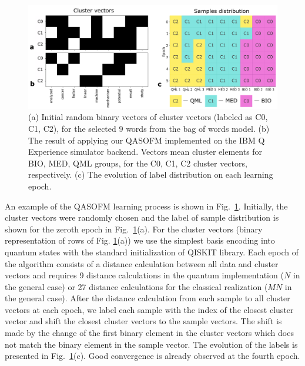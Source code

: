 \documentclass[pra,showkeys,twocolumn,showpacs,aps,10pt]{revtex4-2}
\begin{document}
\begin{figure}[t]
  \includegraphics[width=1.85\columnwidth]{convergence.png}
  \caption{
    (a) Initial random binary vectors of cluster vectors (labeled as C0, C1, C2),
    for the selected 9 words from the bag of words model.
    (b) The result of applying our QASOFM implemented on the IBM Q Experience simulator backend.
    Vectors mean cluster elements for BIO, MED, QML groups,
    for the C0, C1, C2 cluster vectors, respectively.
    (c) The evolution of label distribution on each learning epoch.
  }
  \label{convergence}
\end{figure}


An example of the QASOFM learning process is shown in Fig.~\ref{convergence}.
Initially, the cluster vectors were randomly chosen and the label of sample distribution is shown for the zeroth epoch in Fig.~\ref{convergence}(a). For the cluster  vectors (binary representation of rows of Fig. \ref{convergence}(a)) we use the simplest basis encoding into quantum  states with the standard initialization of QISKIT \cite{rathQuantumDataEncoding2024,qiskit} library.
Each epoch of the algorithm consists of a distance calculation between all data and cluster vectors
and requires 9 distance calculations in the  quantum implementation ($N$ in the general case)
or 27 distance calculations for the classical realization
($MN$ in the general case).
After the distance calculation from each sample to all cluster vectors at each epoch, we label each sample with the index of the closest cluster vector
and shift the closest cluster vectors to the sample vectors.
The shift is made by the change of the first binary element in the cluster vectors which does not match the binary element in the sample vector.
The evolution of the labels is presented in Fig.~\ref{convergence}(c).
Good convergence is already observed at the fourth epoch.
\end{document}
